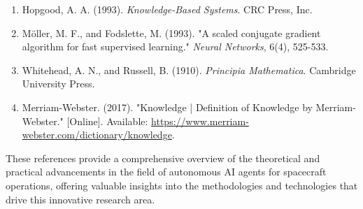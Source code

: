 \documentclass[a4paper,12pt]{article}
\begin{document}
\begin{enumerate}
    \item Hopgood, A. A. (1993). \textit{Knowledge-Based Systems}. CRC Press, Inc.
    
    \item Möller, M. F., and Fodslette, M. (1993). "A scaled conjugate gradient algorithm for fast supervised learning." \textit{Neural Networks}, 6(4), 525-533.
    
    \item Whitehead, A. N., and Russell, B. (1910). \textit{Principia Mathematica}. Cambridge University Press.
    
    \item Merriam-Webster. (2017). "Knowledge | Definition of Knowledge by Merriam-Webster." [Online]. Available: \url{https://www.merriam-webster.com/dictionary/knowledge}.
\end{enumerate}

These references provide a comprehensive overview of the theoretical and practical advancements in the field of autonomous AI agents for spacecraft operations, offering valuable insights into the methodologies and technologies that drive this innovative research area.
\end{document}
